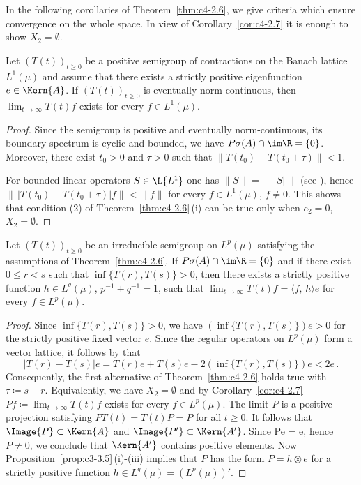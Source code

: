 In the following corollaries of Theorem~\ref{thm:c4-2.6}, we give criteria which ensure convergence on the whole space.
In view of Corollary~\ref{cor:c4-2.7} it is enough to show $X_{2} = \emptyset$.
\begin{corollary}\label{cor:c4-2.9}
%
Let $(T(t))_{t \geq 0}$ be a positive semigroup of contractions on the Banach lattice $L^{1}(\mu)$ and assume that there exists a strictly positive eigenfunction $e \in \Kern{A}$.
If\/ $(T(t))_{t \geq 0}$ is eventually norm-continuous, then $\lim_{t \to \infty}T(t)f$ exists for every $f \in L^{1}(\mu)$.
\end{corollary}
\begin{proof}
Since the semigroup is positive and eventually norm-continuous, its boundary spectrum is cyclic and bounded, \ie  we have $P{\sigma}(A) \cap \im\R = \{0\}$.
Moreover, there exist $t_{0} > 0$ and $\tau > 0$ such that $\|T(t_{0}) - T(t_{0}+\tau)\| < 1$.

For bounded linear operators $S \in \L{L^{1}}$ 
one has $\|S\| = \|\,|S|\,\|$ (see \textcite[IV, Theorem 1.5]{schaefer:1974}), hence $\|\,|T(t_{0}) - T(t_{0}+\tau)| f\| < \|f\|$ for every $f \in L^{1}(\mu)$, $f \neq 0$.
This shows that condition (2) of Theorem~\ref{thm:c4-2.6}\,(i) can be true only when $e_{2} = 0$, \ie  $X_{2} = \emptyset$.
\end{proof}
\begin{corollary}\label{cor:c4-2.10}
%
%
Let $(T(t))_{t\geq 0}$ be an irreducible semigroup on $L^{p}(\mu)$ satisfying the assumptions of Theorem~\ref{thm:c4-2.6}.
If\/ $P{\sigma}(A) \cap \im\R = \{0\}$ and if there exist $0 \leq r < s$ such that $\inf\{T(r),T(s)\} > 0$, then there exists a strictly positive function $h \in L^{q}(\mu)$, $p^{-1}+q^{-1} = 1$, such that $\lim_{t \to \infty} T(t)f = \langle f,\,h \rangle e$ for every $f \in L^{p}(\mu)$.
\end{corollary}
\begin{proof}
Since $\inf\{T(r),T(s)\} > 0$, we have $(\inf\{T(r),T(s)\})e > 0$ for the strictly positive fixed vector $e$.
Since the regular operators on $L^{p}(\mu)$ form a vector lattice, it follows by \textcite[II.1.4, Formula (5) \& (5')]{schaefer:1974} that 
\[
|T(r) - T(s)|e = T(r)e + T(s)e - 2(\inf\{T(r),T(s)\})e < 2e\,.
\]
Consequently, the first alternative of Theorem~\ref{thm:c4-2.6} holds true with $\tau \coloneqq s-r$.
Equivalently, we have $X_{2} = \emptyset$ and by Corollary~\ref{cor:c4-2.7} $Pf \coloneqq \lim_{t \to \infty} T(t)f$ exists for every $f \in L^{p}(\mu)$.
The limit $P$ is a positive projection satisfying $PT(t) = T(t)P = P$ for all $t \geq 0$.
It follows that $\Image{P} \subset \Kern{A}$ and $\Image{P'} \subset \Kern{A'}$.
Since Pe = e, hence $P \neq 0$, we conclude that $\Kern{A'}$ contains positive elements.
Now Proposition~\ref{prop:c3-3.5}\,(i)-(iii) implies that $P$ has the form $P = h \otimes e$ for a strictly positive function $h \in L^{q}(\mu) = (L^{p}(\mu))'$.
\end{proof}
